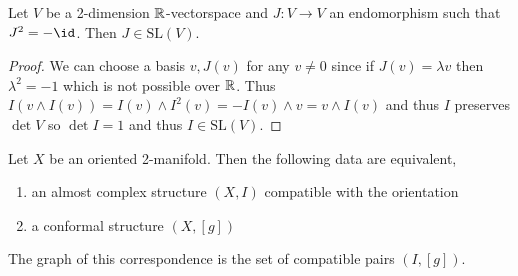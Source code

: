 \documentclass[12pt]{article}
\begin{document}
\begin{lemma}
Let $V$ be a 2-dimension $\mathbb{R}$-vectorspace and $J : V \to V$ an endomorphism such that $J^2 = - \id$. Then $J \in \mathrm{SL}(V)$.
\end{lemma}

\begin{proof}
We can choose a basis $v, J(v)$ for any $v \neq 0$ since if $J(v) = \lambda v$ then $\lambda^2 = -1$ which is not possible over $\mathbb{R}$. Thus $I(v \wedge I(v)) = I(v) \wedge I^2(v) = - I(v) \wedge v = v \wedge I(v)$ and thus $I$ preserves $\det{V}$ so $\det{I} = 1$ and thus $I \in \mathrm{SL}(V)$. 
\end{proof}

\begin{prop}
Let $X$ be an oriented 2-manifold. Then the following data are equivalent,
\begin{enumerate}
\item an almost complex structure $(X, I)$ compatible with the orientation
\item a conformal structure $(X, [g])$
\end{enumerate}
The graph of this correspondence is the set of compatible pairs $(I, [g])$.
\end{prop}
\end{document}
